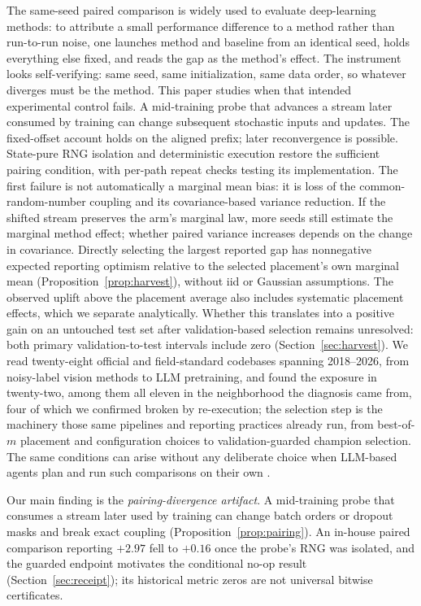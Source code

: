 \noindent The same-seed paired comparison is widely used to evaluate deep-learning
methods: to attribute a small performance difference to a method rather
than run-to-run noise, one launches method and baseline from an identical
seed, holds everything else fixed, and reads the gap as the method's
effect. The instrument looks self-verifying: same seed, same
initialization, same data order, so whatever diverges must be the method.
This paper studies when that intended experimental control fails. A
mid-training probe that advances a stream later consumed by training can
change subsequent stochastic inputs and updates. The fixed-offset account
holds on the aligned prefix; later reconvergence is possible.
State-pure RNG isolation and deterministic execution restore the sufficient
pairing condition, with per-path repeat checks testing its implementation.
The first failure is not automatically a marginal mean bias: it is loss of
the common-random-number coupling and its covariance-based variance reduction.
If the shifted stream preserves the arm's marginal law, more seeds still
estimate the marginal method effect; whether paired variance increases depends
on the change in covariance. Directly selecting the largest reported gap has
nonnegative expected reporting optimism relative to the selected placement's
own marginal mean (Proposition~\ref{prop:harvest}), without iid or Gaussian
assumptions. The observed uplift above the placement average also includes
systematic placement effects, which we separate analytically. Whether this
translates into a positive gain on an untouched test set after validation-based
selection remains unresolved: both primary validation-to-test intervals include zero
(Section~\ref{sec:harvest}).
We read twenty-eight official and field-standard codebases spanning
2018--2026, from noisy-label vision methods to LLM pretraining, and found the
exposure in twenty-two, among them all eleven in the neighborhood the diagnosis
came from, four of which we confirmed broken by re-execution; the selection
step is the machinery those
same pipelines and reporting practices already run, from best-of-$m$ placement
and configuration choices to validation-guarded champion selection.
The same conditions can arise without any deliberate choice when LLM-based
agents plan and run such comparisons on their own \citep{xu2026selfevolving}.

Our main finding is the \emph{pairing-divergence artifact}. A mid-training
probe that consumes a stream later used by training can change batch orders
or dropout masks and break exact coupling (Proposition~\ref{prop:pairing}). An in-house paired
comparison reporting $+2.97$ fell to $+0.16$ once the probe's RNG was isolated,
and the guarded endpoint motivates the conditional no-op result
(Section~\ref{sec:receipt}); its historical metric zeros are not universal
bitwise certificates.

